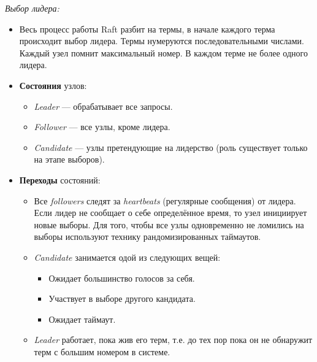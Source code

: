 \begin{algorithm} \textit{Выбор лидера:}
    \begin{itemize}
        \item Весь процесс работы Raft разбит на термы, в начале каждого терма
            происходит выбор лидера. Термы нумеруются последовательными числами.
            Каждый узел помнит максимальный номер. В каждом терме не более
            одного лидера.
        \item \textbf{Состояния} узлов:
            \begin{itemize}
                \item \textit{Leader} --- обрабатывает все запросы.
                \item \textit{Follower} --- все узлы, кроме лидера.
                \item \textit{Candidate} --- узлы претендующие на лидерство
                    (роль существует только на этапе выборов).
            \end{itemize}
        \newpage
        \item \textbf{Переходы} состояний:
            \begin{itemize}
                \item Все \textit{followers} следят за \textit{heartbeats}
                    (регулярные сообщения) от лидера. Если лидер не сообщает
                    о себе определённое время, то узел инициирует новые выборы.
                    Для того, чтобы все узлы одновременно не ломились на выборы
                    используют технику рандомизированных таймаутов.
                \item \textit{Candidate} занимается одой из следующих вещей:
                    \begin{itemize}
                        \item Ожидает большинство голосов за себя.
                        \item Участвует в выборе другого кандидата.
                        \item Ожидает таймаут.
                    \end{itemize}
                \item \textit{Leader} работает, пока жив его терм, т.е. до тех пор
                    пока он не обнаружит терм с большим номером в системе.
            \end{itemize}
    \end{itemize}
\end{algorithm}

